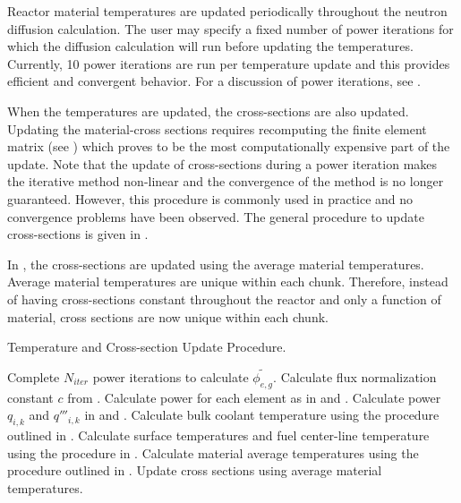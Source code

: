   Reactor material temperatures are updated periodically throughout the 
  neutron diffusion calculation. The user may specify a fixed number of power
  iterations for which the diffusion calculation will run before updating the
  temperatures. Currently, 10 power iterations are run per temperature update
  and this provides efficient and convergent behavior.
  For a discussion of power iterations, see .
  
  When
  the temperatures are updated, the cross-sections are also updated. Updating
  the material-cross sections requires recomputing the finite element matrix
  (see )
  which proves to be the most computationally expensive part of the update. 
  Note that the update of cross-sections during a power iteration makes the
  iterative method non-linear and the convergence of the method is no longer
  guaranteed. However, this procedure is commonly used in practice and no 
  convergence problems have been observed. The general procedure to update
  cross-sections is given in .

  In , the cross-sections are
  updated using the average material temperatures. Average material
  temperatures are unique within each chunk. Therefore, instead of having
  cross-sections constant throughout the reactor and only a function of
  material, cross sections are now unique within each chunk.

  \begin{algorithm}
    \caption{Temperature and Cross-section Update Procedure.}
    \label{algorithm:temperature_update}
    \begin{algorithmic}[1]
      \State Complete $N_{iter}$ power iterations to calculate
        $\widetilde{\phi_{e,g}}$.
      \State Calculate flux normalization constant $c$ from
        .
      \State Calculate power for each element as in  and
        .
        \State Calculate power $q_{i,k}$ and $q'''_{i,k}$ in 
          and .
        \State Calculate bulk coolant temperature using the 
          procedure outlined in .
        \State Calculate surface temperatures and fuel center-line temperature
          using the procedure in .
        \State Calculate material average temperatures using the procedure 
          outlined in .
        \State Update cross sections using average material temperatures.
      \EndFor
    \end{algorithmic}
  \end{algorithm}

